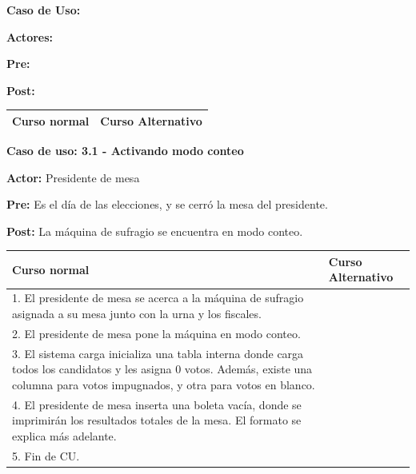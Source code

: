 \textbf{Caso de Uso: }

\textbf{Actores:} 

\textbf{Pre:} 

\textbf{Post:}
\begin{table}[h!]
	
 \begin{tabular}{|p{7.5cm} | p{7.5cm}|} 
 \hline
 \textbf{Curso normal} & \textbf{Curso Alternativo} \\
 \hline

 \end{tabular}

\end{table}



\textbf{Caso de uso: 3.1 - Activando modo conteo}

\textbf{Actor:} Presidente de mesa

\textbf{Pre:} Es el día de las elecciones, y se cerró la mesa del presidente.

\textbf{Post:} La máquina de sufragio se encuentra en modo conteo.

\begin{table}[h!]
	
 \begin{tabular}{|p{7.5cm} | p{7.5cm}|} 
 \hline
 \textbf{Curso normal} & \textbf{Curso Alternativo} \\
 \hline


1. El presidente de mesa se acerca a la máquina de sufragio asignada a su mesa junto con la urna y los fiscales. & \\
\hline

2. El presidente de mesa pone la máquina en modo conteo. & \\
\hline

3. El sistema carga inicializa una tabla interna donde carga todos los candidatos y les asigna 0 votos. Además, existe una columna para votos impugnados, y otra para votos en blanco. & \\
\hline

4. El presidente de mesa inserta una boleta vacía, donde se imprimirán los resultados totales de la mesa. El formato se explica más adelante. & \\
\hline

5. Fin de CU. & \\
\hline

\end{tabular}
\end{table}


